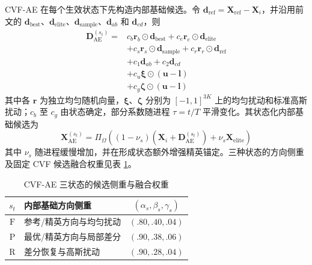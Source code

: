 CVF-AE 在每个生效状态下先构造内部基础候选。令 $\mathbf d_{\mathrm{ref}}=\mathbf X_{\mathrm{ref}}-\mathbf X_i$，并沿用前文的 $\mathbf d_{\mathrm{best}}$、$\mathbf d_{\mathrm{elite}}$、$\mathbf d_{\mathrm{sample}}$、$\mathbf d_{ab}$ 和 $\mathbf d_{cd}$，则
\begin{equation}
    \begin{aligned}
    \mathbf D_{\mathrm{AE}}^{(s_t)}
    ={}&c_b\mathbf r_b\odot\mathbf d_{\mathrm{best}}
    +c_e\mathbf r_e\odot\mathbf d_{\mathrm{elite}}
    \\
    &+c_s\mathbf r_s\odot\mathbf d_{\mathrm{sample}}
    +c_r\mathbf r_r\odot\mathbf d_{\mathrm{ref}}\\
    &+c_1\mathbf d_{ab}+c_2\mathbf d_{cd}\\
    &+c_u\boldsymbol\xi\odot(\mathbf u-\mathbf l)\\
    &+c_g\boldsymbol\zeta\odot(\mathbf u-\mathbf l)
    \end{aligned}
    \label{eq:ae-state-direction}
\end{equation}
其中各 $\mathbf r$ 为独立均匀随机向量，$\boldsymbol\xi$、$\boldsymbol\zeta$ 分别为 $[-1,1]^{3K}$ 上的均匀扰动和标准高斯扰动；$c_b$ 至 $c_g$ 由状态确定，部分系数随进程 $\tau=t/T$ 平滑变化。其状态化内部基础候选为
\begin{equation}
    \mathbf X_{\mathrm{AE}}^{(s_t)}=
    \Pi_{\Omega}
    \left(
    (1-\nu_s)(\mathbf X_i+\mathbf D_{\mathrm{AE}}^{(s_t)})
    +\nu_s\mathbf X_{\mathrm{elite}}
    \right)
    \label{eq:state-ae-candidate}
\end{equation}
其中 $\nu_s$ 随进程缓慢增加，并在形成状态额外增强精英锚定。三种状态的方向侧重及固定 CVF 候选融合权重见表 \ref{tab:cvf-state-coefficients}。

\begin{table}[tbp]
\centering
\caption{CVF-AE 三状态的候选侧重与融合权重}
\label{tab:cvf-state-coefficients}
\footnotesize
\begin{tabularx}{\columnwidth}{@{}c X c@{}}
\toprule
$s_t$ & 内部基础方向侧重 & $(\alpha_s,\beta_s,\gamma_s)$\\
\midrule
$\mathrm{F}$ & 参考/精英方向与均匀扰动 & $(.80,.40,.04)$\\
$\mathrm{P}$ & 最优/精英方向与局部差分 & $(.90,.38,.06)$\\
$\mathrm{R}$ & 差分恢复与高斯扰动 & $(.90,.28,.04)$\\
\bottomrule
\end{tabularx}
\end{table}

